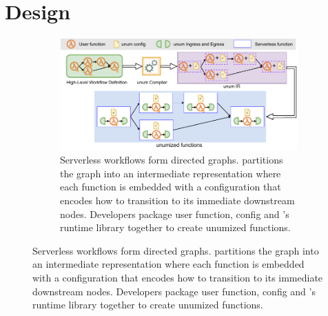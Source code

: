 \section{Design}

\begin{figure}[t]
	\centering
	\begin{subfigure}[t]{0.8\textwidth}
	\centering
		\includegraphics[width=0.8\columnwidth]{figures/unum-arch-compile-time.pdf}
		\caption{Serverless workflows form directed graphs. \name{}
		partitions the graph into an intermediate representation where each
		function is embedded with a configuration that encodes how to
		transition to its immediate downstream nodes. Developers package user
		function, \name{} config and \name{}'s runtime library together to
		create unumized functions.}
		\label{fig:arch:unum-compile-time}


\end{subfigure}
\end{figure}
